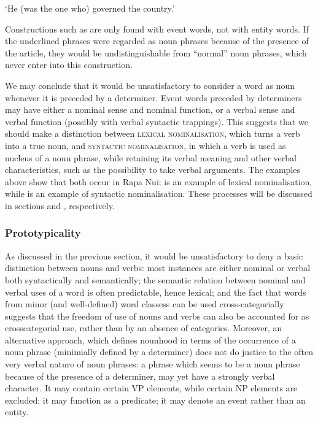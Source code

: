 \glt
‘He (was the one who) governed the country.’ \textstyleExampleref{[R370.005]} 
\z

Constructions such as  are only found with event words, not with entity words. If the underlined phrases were regarded as noun phrases because of the presence of the article, they would be undistinguishable from “normal” noun phrases, which never enter into this construction.

We may conclude that it would be unsatisfactory to consider a word as noun whenever it is preceded by a determiner. Event words preceded by determiners may have either a nominal sense and nominal function, or a verbal sense and verbal function (possibly with verbal syntactic trappings). This suggests that we should make a distinction between \textsc{lexical nominalisation}, which turns a verb into a true noun, and \textsc{syntactic nominalisation}, in which a verb is used as nucleus of a noun phrase, while retaining its verbal meaning and other verbal characteristics, such as the possibility to take verbal arguments. The examples above show that both occur in Rapa Nui:  is an example of lexical nominalisation, while  is an example of syntactic nominalisation. These processes will be discussed in sections  and , respectively.

\largerpage
\subsubsection[Prototypicality]{Prototypicality}\label{sec:3.2.1.2}
As discussed in the previous section, it would be unsatisfactory to deny a basic distinction between nouns and verbs: most instances are either nominal or verbal both syntactically and semantically; the semantic relation between nominal and verbal uses of a word is often predictable, hence lexical; and the fact that words from minor (and well-defined) word classess can be used cross-categorially suggests that the freedom of use of nouns and verbs can also be accounted for as crosscategorial use, rather than by an absence of categories. Moreover, an alternative approach, which defines nounhood in terms of the occurrence of a noun phrase (minimially defined by a determiner) does not do justice to the often very verbal nature of noun phrases: a phrase which seems to be a noun phrase because of the presence of a determiner, may yet have a strongly verbal character. It may contain certain VP elements, while certain NP elements are excluded; it may function as a predicate; it may denote an event rather than an entity. 

